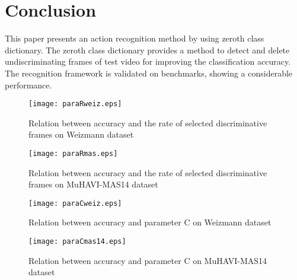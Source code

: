 \documentclass{article}
\begin{document}
\section{Conclusion}
This paper presents an action recognition method by using zeroth class dictionary.
The zeroth class dictionary provides a method to detect and delete undiscriminating
frames of test video for improving the classification accuracy.
The recognition framework is validated on benchmarks, showing a considerable performance.


\begin{figure}[htbp]
\centering
\texttt{[image: paraRweiz.eps]}
\caption{Relation between accuracy  and the rate of selected discriminative frames on Weizmann dataset}
\label{Fig3}
\end{figure}


\begin{figure}[htbp]
\centering
\texttt{[image: paraRmas.eps]}
\caption{Relation between accuracy  and the rate of selected discriminative frames on MuHAVI-MAS14 dataset }
\label{Fig3}
\end{figure}





\begin{figure}[htbp]
\centering
\texttt{[image: paraCweiz.eps]}
\caption{Relation between accuracy  and parameter C on Weizmann dataset}
\label{Fig3}
\end{figure}




\begin{figure}[htbp]
\centering
\texttt{[image: paraCmas14.eps]}
\caption{Relation between accuracy and parameter C on MuHAVI-MAS14 dataset}
\label{Fig3}
\end{figure}
\end{document}
